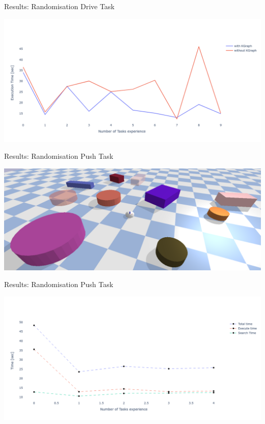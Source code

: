 \begin{frame}[fragile]{Results: Randomisation Drive Task} %
\begin{center}
\includegraphics[width=1.0\textwidth]{figures/results/random_drive_with_without_kgraph}
\end{center}
\end{frame}


\begin{frame}[fragile]{Results: Randomisation Push Task} %
\begin{center}
\includegraphics[width=1.0\textwidth]{figures/results/random_1}
\end{center}
\end{frame}



\begin{frame}[fragile]{Results: Randomisation Push Task} %
\begin{center}
\includegraphics[width=1.0\textwidth]{figures/results/random_push_execution_times}
\end{center}
\end{frame}

